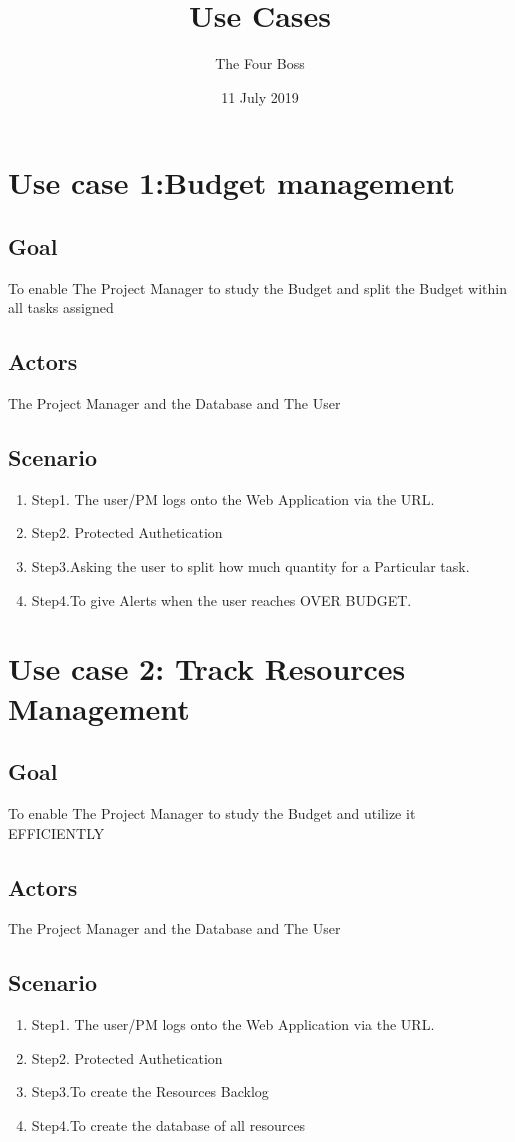 \documentclass[10pt]{article}
\title{Use Cases}
\author{The Four Boss}
\date{ 11 July 2019}
\begin{document}
\maketitle
\tableofcontents
\section*{Use case 1:Budget management}
\subsection{Goal}
To enable The Project Manager to study the Budget and split the Budget within all tasks assigned
\subsection{Actors}
The Project Manager and the Database and The User 
\subsection{Scenario}
\begin{enumerate}
\item Step1. The user/PM logs onto the Web Application via the URL.
\item Step2. Protected Authetication
\item Step3.Asking the user to split how much quantity for a Particular task.
\item Step4.To give Alerts when the user reaches OVER BUDGET.
\end{enumerate}


\section*{Use case 2: Track Resources Management}
\subsection{Goal}
To enable The Project Manager to study the Budget and utilize it EFFICIENTLY
\subsection{Actors}
The Project Manager and the Database and The User 
\subsection{Scenario}
\begin{enumerate}
\item Step1. The user/PM logs onto the Web Application via the URL.
\item Step2. Protected Authetication
\item Step3.To create the Resources Backlog
\item Step4.To create the database of all resources 
\end{enumerate}
\end{document}
